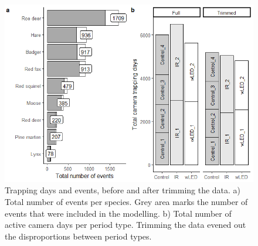\begin{figure}
	\centering
	\includegraphics[width=\textwidth]{../R/glmm_sp_files/figure-html/days-count-2.png} 
		\caption[Camera trapping days and number of events]%
	{\scriptsize Trapping days and events, before and after trimming the data. a) Total number of events per species. Grey area marks the number of events that were included in the modelling. b) Total number of active camera days per period type. Trimming the data evened out the disproportions between period types.}\label{fig:events}
\end{figure}


